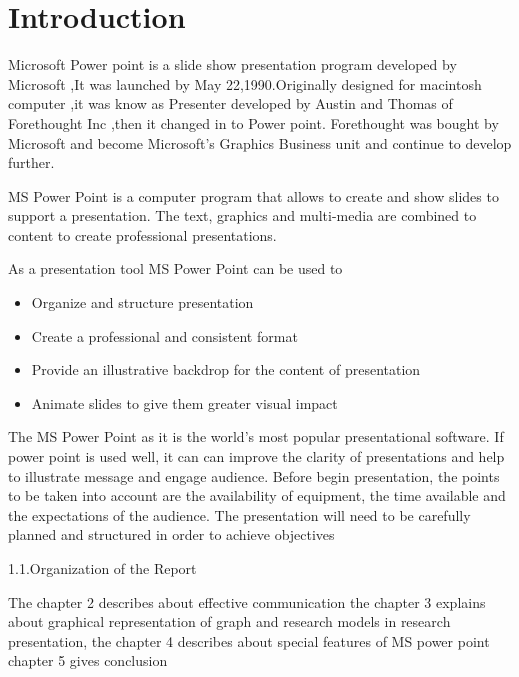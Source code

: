 \chapter{\textbf{Introduction}}
 Microsoft Power point is a slide show presentation program developed by Microsoft ,It was launched by May 22,1990.Originally designed for macintosh computer ,it was know as Presenter developed by Austin and Thomas of Forethought
 Inc ,then it changed in to Power point.  Forethought was bought by Microsoft and become Microsoft's Graphics Business unit and continue to develop  further.

 MS Power Point is a computer program that allows to create and show slides to support a presentation. The text, graphics and multi-media are combined to content to create professional presentations.

As a presentation tool MS Power Point can be used to\cite {Carlo satta}
\begin{itemize}
  \item Organize and structure presentation
  \item Create a professional and consistent format
  \item Provide an illustrative backdrop for the content of presentation
  \item Animate slides to give them greater visual impact
\end{itemize}



	

The MS Power Point as it is the world's most popular presentational software. If power point is used well, it can can improve the clarity of presentations and help to illustrate message and engage audience. Before begin presentation, the points to be taken into account are the availability of equipment, the time available and the expectations of the audience. The presentation will need to be carefully planned and structured in order to achieve objectives\cite {Negriono}

1.1.Organization of the Report

The  chapter 2 describes about effective communication the chapter 3 explains about graphical representation of graph and research models in research presentation, the chapter 4 describes about special features of MS power point chapter 5 gives conclusion

















